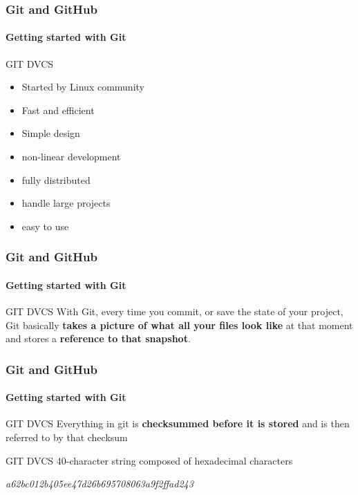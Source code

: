 \begin{frame}
    \frametitle{Git and GitHub}
    \framesubtitle{Getting started with Git}
    \addtocounter{nframe}{1}
    
    \begin{block}{GIT DVCS}
       \begin{itemize}
           \item Started by Linux community
           \item Fast and efficient 
           \item Simple design
           \item non-linear development
           \item fully distributed
           \item handle large projects
           \item easy to use
       \end{itemize}
    
    \end{block}

\end{frame}

\begin{frame}
    \frametitle{Git and GitHub}
    \framesubtitle{Getting started with Git}
    \addtocounter{nframe}{1}
    
    \begin{block}{GIT DVCS}
        With Git, every time you commit, or save the state of your project, Git basically \textbf{takes a picture of what all your files look like} at that moment and stores a \textbf{reference to that snapshot}.    
    \end{block}

\end{frame}

\begin{frame}
    \frametitle{Git and GitHub}
    \framesubtitle{Getting started with Git}
    \addtocounter{nframe}{1}
    
    \begin{block}{GIT DVCS}
        Everything in git is \textbf{checksummed before it is stored} and is then referred to by that checksum
    \end{block}

    \begin{block}{GIT DVCS}
        40-character string composed of hexadecimal characters
    \end{block}
   
    \textit{a62bc012b405ee47d26b695708063a9f2ffad243}

\end{frame}




